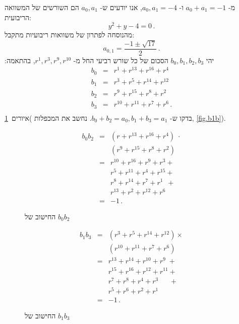 \documentclass[11pt,a4paper]{article}
\newenvironment{form}[1]{%
\begin{displaymath}%
\renewcommand{\arraystretch}{#1}%
\begin{array}{lcl}}%
{\end{array}%
\end{displaymath}%
}
\begin{document}
מ-%
$a_0+a_1=-1$
ו-%
$a_0,a_1=-4$,
אנו יודעים ש-%
$a_0,a_1$
הם השורשים של המשוואה הריבועית:
\[
y^2+y-4=0\,.
\]
מהנוסחה לפתרון של משוואות ריבועיות מתקבל:
\[
a_{0,1} = \frac{-1\pm\sqrt{17}}{2}\,.
\]
יהי
$b_0,b_1,b_2,b_3$
הסכום של כל שורש רביעי החל מ-%
$r^1,r^3,r^9,r^{10}$,
בהתאמה:
\begin{form}{1.3}
b_0&=& r^1+ r^{13} + r^{16} + r^4\\
b_1&=& r^3+ r^{5} + r^{14} + r^{12}\\
b_2&=& r^9+ r^{15} + r^{8} + r^2\\
b_3&=& r^{10}+ r^{11} + r^{7} + r^6\,.\\
\end{form}
בדקו ש-%
$b_0+b_2=a_0, b_1+b_3=a_1$.
נחשב את המכפלות
)איורים~\ref{fig.b0b2}, \ref{fig.b1b}).
\begin{figure}[tb]
\begin{form}{1.3}
b_0b_2&=&(r + r^{13} + r^{16} +r^4)\;\cdot\\
&&(r^9 + r^{15} + r^{8} +r^{2})\\
&=& r^{10}+r^{16}+r^9+r^3+\\
&& r^{5}+r^{11}+r^4+r^{15}+\\
&& r^{8}+r^{14}+r^7+r^1\;\:+\\
&& r^{13}+r^{2}+r^{12}+r^6\\
&=&-1\,.
\end{form}\vspace{-2em}
\caption{החישוב של $b_0b_2$}\label{fig.b0b2}
\end{figure}
\begin{figure}[tb]
\begin{form}{1.3}
b_1b_3&=&(r^3 + r^{5} + r^{14} +r^{12})\times\\
&&(r^{10} + r^{11} + r^{7} +r^{6})\\
&=& r^{13}+r^{14}+r^{10}+r^9\;+\\
&& r^{15}+r^{16}+r^{12}+r^{11}+\\
&& r^{7}+r^{8}+r^4+r^3\quad\;\;+\\
&& r^{5}+r^{6}+r^{2}+r^1\\
&=&-1\,.
\end{form}\vspace{-2em}
\caption{החישוב של $b_1b_3$}\label{fig.b1b3}
\end{figure}
\end{document}
